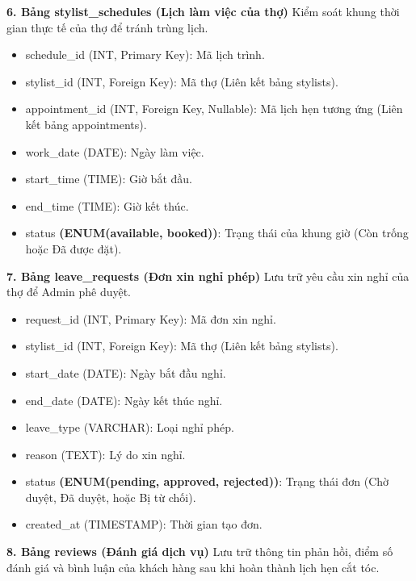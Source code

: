 \documentclass[../BTL.tex]{subfiles}
\begin{document}
\textbf{6. Bảng stylist\_schedules (Lịch làm việc của thợ)} Kiểm soát
khung thời gian thực tế của thợ để tránh trùng lịch.

\begin{itemize}
\item
  schedule\_id (INT, Primary Key): Mã lịch trình.
\item
  stylist\_id (INT, Foreign Key): Mã thợ (Liên kết bảng stylists).
\item
  appointment\_id (INT, Foreign Key, Nullable): Mã lịch hẹn tương ứng
  (Liên kết bảng appointments).
\item
  work\_date (DATE): Ngày làm việc.
\item
  start\_time (TIME): Giờ bắt đầu.
\item
  end\_time (TIME): Giờ kết thúc.
\item
  status \textbf{(ENUM(\textquotesingle available\textquotesingle,
  \textquotesingle booked\textquotesingle))}: Trạng thái của khung giờ
  (Còn trống hoặc Đã được đặt).
\end{itemize}

\textbf{7. Bảng leave\_requests (Đơn xin nghỉ phép)} Lưu trữ yêu cầu xin
nghỉ của thợ để Admin phê duyệt.

\begin{itemize}
\item
  request\_id (INT, Primary Key): Mã đơn xin nghỉ.
\item
  stylist\_id (INT, Foreign Key): Mã thợ (Liên kết bảng stylists).
\item
  start\_date (DATE): Ngày bắt đầu nghỉ.
\item
  end\_date (DATE): Ngày kết thúc nghỉ.
\item
  leave\_type (VARCHAR): Loại nghỉ phép.
\item
  reason (TEXT): Lý do xin nghỉ.
\item
  status \textbf{(ENUM(\textquotesingle pending\textquotesingle,
  \textquotesingle approved\textquotesingle,
  \textquotesingle rejected\textquotesingle))}: Trạng thái đơn (Chờ
  duyệt, Đã duyệt, hoặc Bị từ chối).
\item
  created\_at (TIMESTAMP): Thời gian tạo đơn.
\end{itemize}

\textbf{8. Bảng reviews (Đánh giá dịch vụ)} Lưu trữ thông tin phản hồi,
điểm số đánh giá và bình luận của khách hàng sau khi hoàn thành lịch hẹn
cắt tóc.
\end{document}
